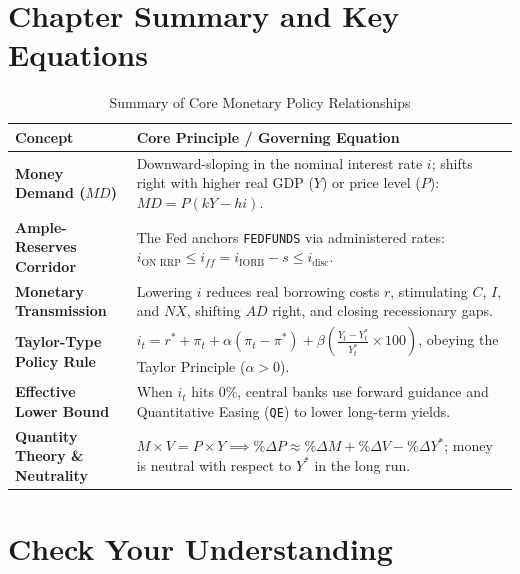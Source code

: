 \documentclass[11pt, a4paper]{article}
\begin{document}
\section{Chapter Summary and Key Equations}

\begin{table}[htbp]
\centering
\renewcommand{\arraystretch}{1.35}
\begin{tabularx}{\textwidth}{>{\bfseries}l X}
\toprule
Concept & Core Principle / Governing Equation \\
\midrule
Money Demand ($MD$) & Downward-sloping in the nominal interest rate $i$; shifts right with higher real GDP ($Y$) or price level ($P$): $MD = P(kY - hi)$. \\
Ample-Reserves Corridor & The Fed anchors \texttt{FEDFUNDS} via administered rates: $i_{\text{ON RRP}} \le i_{ff} = i_{\text{IORB}} - s \le i_{\text{disc}}$. \\
Monetary Transmission & Lowering $i$ reduces real borrowing costs $r$, stimulating $C$, $I$, and $NX$, shifting $AD$ right, and closing recessionary gaps. \\
Taylor-Type Policy Rule & $i_t = r^* + \pi_t + \alpha(\pi_t - \pi^*) + \beta\left(\frac{Y_t - Y_t^*}{Y_t^*} \times 100\right)$, obeying the Taylor Principle ($\alpha > 0$). \\
Effective Lower Bound & When $i_t$ hits $0\%$, central banks use forward guidance and Quantitative Easing (\texttt{QE}) to lower long-term yields. \\
Quantity Theory \& Neutrality & $M \times V = P \times Y \implies \%\Delta P \approx \%\Delta M + \%\Delta V - \%\Delta Y^*$; money is neutral with respect to $Y^*$ in the long run. \\
\bottomrule
\end{tabularx}
\caption{Summary of Core Monetary Policy Relationships}
\end{table}

\section{Check Your Understanding}
\end{document}
